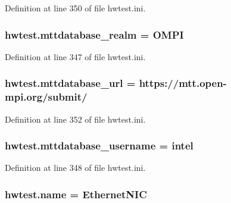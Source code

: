 Definition at line 350 of file hwtest.\-ini.

\hypertarget{namespacehwtest_a06dff656b8aa4743a2d09ea2a47e088b}{
\subsubsection[{mttdatabase\-\_\-realm}]{\setlength{\rightskip}{0pt plus 5cm}hwtest.\-mttdatabase\-\_\-realm = O\-M\-P\-I}}\label{namespacehwtest_a06dff656b8aa4743a2d09ea2a47e088b}


Definition at line 347 of file hwtest.\-ini.

\hypertarget{namespacehwtest_a4a582498db594ca409429642d4690a1d}{
\subsubsection[{mttdatabase\-\_\-url}]{\setlength{\rightskip}{0pt plus 5cm}hwtest.\-mttdatabase\-\_\-url = https\-://mtt.\-open-\/mpi.\-org/submit/}}\label{namespacehwtest_a4a582498db594ca409429642d4690a1d}


Definition at line 352 of file hwtest.\-ini.

\hypertarget{namespacehwtest_a78763492ac95e935dc66de47a7b24374}{
\subsubsection[{mttdatabase\-\_\-username}]{\setlength{\rightskip}{0pt plus 5cm}hwtest.\-mttdatabase\-\_\-username = intel}}\label{namespacehwtest_a78763492ac95e935dc66de47a7b24374}


Definition at line 348 of file hwtest.\-ini.

\hypertarget{namespacehwtest_afe5609741ec9bca621277528b05b63c8}{
\subsubsection[{name}]{\setlength{\rightskip}{0pt plus 5cm}hwtest.\-name = Ethernet\-N\-I\-C}}\label{namespacehwtest_afe5609741ec9bca621277528b05b63c8}



